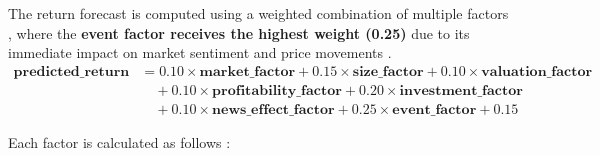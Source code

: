 \documentclass[3p,times,procedia]{elsarticle}
\begin{document}
The return forecast is computed using a weighted \allowbreak combination of multiple factors \cite{FAMA1993}, where the \textbf{event factor receives the highest weight (0.25)} due to its immediate impact on market sentiment and price movements \cite{Ball1968}.
\begin{align}
\mathbf{predicted\_return} &= 0.10 \times \mathbf{market\_factor} + 0.15 \times \mathbf{size\_factor} + 0.10 \times \mathbf{valuation\_factor} \nonumber \\
&\quad + 0.10 \times \mathbf{profitability\_factor} + 0.20 \times \mathbf{investment\_factor} \nonumber \\
&\quad + 0.10 \times \mathbf{news\_effect\_factor} + \mathbf{0.25} \times \mathbf{event\_factor} + 0.15
\end{align}


Each factor is calculated as follows \cite{Carhart1997}:
\end{document}
